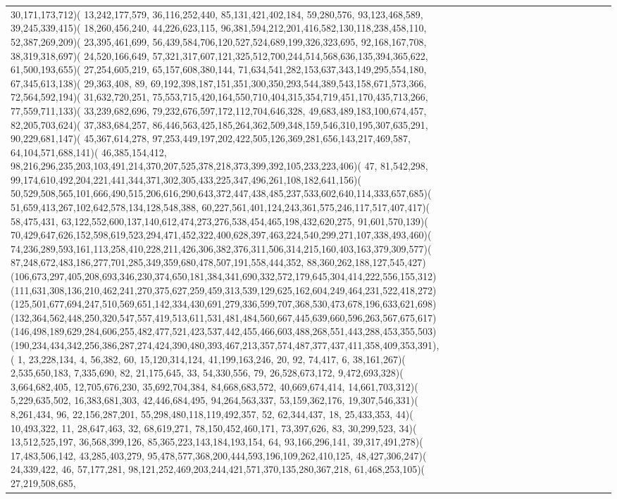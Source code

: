 \documentclass[varwidth=\maxdimen,border=10]{standalone}
\begin{document}
\begin{tabular}{@{}l@{}l@{}l@{}l@{}l@{}l@{}l@{}l@{}l@{}l@{}l@{}l@{}l@{}l@{}l@{}l@{}l@{}l@{}}
30,171,173,712)( 13,242,177,579, 36,116,252,440, 85,131,421,402,184, 59,280,576, 93,123,468,589, 39,245,339,415)( 18,260,456,240, 44,226,623,115, 96,381,594,212,201,416,582,130,118,238,458,110, 52,387,269,209)( 23,395,461,699, 56,439,584,706,120,527,524,689,199,326,323,695, 92,168,167,708, 38,319,318,697)( 24,520,166,649, 57,321,317,607,121,325,512,700,244,514,568,636,135,394,365,622, 61,500,193,655)( 27,254,605,219, 65,157,608,380,144, 71,634,541,282,153,637,343,149,295,554,180, 67,345,613,138)( 29,363,408, 89, 69,192,398,187,151,351,300,350,293,544,389,543,158,671,573,366, 72,564,592,194)( 31,632,720,251, 75,553,715,420,164,550,710,404,315,354,719,451,170,435,713,266, 77,559,711,133)( 33,239,682,696, 79,232,676,597,172,112,704,646,328, 49,683,489,183,100,674,457, 82,205,703,624)( 37,383,684,257, 86,446,563,425,185,264,362,509,348,159,546,310,195,307,635,291, 90,229,681,147)( 45,367,614,278, 97,253,449,197,202,422,505,126,369,281,656,143,217,469,587, 64,104,571,688,141)( 46,385,154,412, 98,216,296,235,203,103,491,214,370,207,525,378,218,373,399,392,105,233,223,406)( 47, 81,542,298, 99,174,610,492,204,221,441,344,371,302,305,433,225,347,496,261,108,182,641,156)( 50,529,508,565,101,666,490,515,206,616,290,643,372,447,438,485,237,533,602,640,114,333,657,685)( 51,659,413,267,102,642,578,134,128,548,388, 60,227,561,401,124,243,361,575,246,117,517,407,417)( 58,475,431, 63,122,552,600,137,140,612,474,273,276,538,454,465,198,432,620,275, 91,601,570,139)( 70,429,647,626,152,598,619,523,294,471,452,322,400,628,397,463,224,540,299,271,107,338,493,460)( 74,236,289,593,161,113,258,410,228,211,426,306,382,376,311,506,314,215,160,403,163,379,309,577)( 87,248,672,483,186,277,701,285,349,359,680,478,507,191,558,444,352, 88,360,262,188,127,545,427)(106,673,297,405,208,693,346,230,374,650,181,384,341,690,332,572,179,645,304,414,222,556,155,312)(111,631,308,136,210,462,241,270,375,627,259,459,313,539,129,625,162,604,249,464,231,522,418,272)(125,501,677,694,247,510,569,651,142,334,430,691,279,336,599,707,368,530,473,678,196,633,621,698)(132,364,562,448,250,320,547,557,419,513,611,531,481,484,560,667,445,639,660,596,263,567,675,617)(146,498,189,629,284,606,255,482,477,521,423,537,442,455,466,603,488,268,551,443,288,453,355,503)(190,234,434,342,256,386,287,274,424,390,480,393,467,213,357,574,487,377,437,411,358,409,353,391), (  1, 23,228,134,  4, 56,382, 60, 15,120,314,124, 41,199,163,246, 20, 92, 74,417,  6, 38,161,267)(  2,535,650,183,  7,335,690, 82, 21,175,645, 33, 54,330,556, 79, 26,528,673,172,  9,472,693,328)(  3,664,682,405, 12,705,676,230, 35,692,704,384, 84,668,683,572, 40,669,674,414, 14,661,703,312)(  5,229,635,502, 16,383,681,303, 42,446,684,495, 94,264,563,337, 53,159,362,176, 19,307,546,331)(  8,261,434, 96, 22,156,287,201, 55,298,480,118,119,492,357, 52, 62,344,437, 18, 25,433,353, 44)( 10,493,322, 11, 28,647,463, 32, 68,619,271, 78,150,452,460,171, 73,397,626, 83, 30,299,523, 34)( 13,512,525,197, 36,568,399,126, 85,365,223,143,184,193,154, 64, 93,166,296,141, 39,317,491,278)( 17,483,506,142, 43,285,403,279, 95,478,577,368,200,444,593,196,109,262,410,125, 48,427,306,247)( 24,339,422, 46, 57,177,281, 98,121,252,469,203,244,421,571,370,135,280,367,218, 61,468,253,105)( 27,219,508,685, 
\end{tabular}
\end{document}
